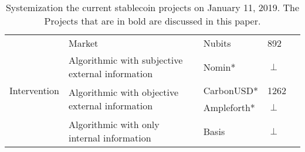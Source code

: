 \begin{table}[h!]
\begin{tabular}{|l|l|l|l|l|}
                                                                                                                 
\multirow{5}{*}{Intervention}                                                           
						& \multirow{1}{*}{Market} 										& Nubits & 892 \\ \cline{2-4}
						& \multirow{1}{*}{Algorithmic with subjective external information}  		& Nomin* & $\perp$  \\ \cline{2-4}
						& \multirow{2}{*}{Algorithmic with objective external information}  		& CarbonUSD* & 1262 \\ \cline{3-4}
						&														& Ampleforth* & $\perp$ \\ \cline{2-4}
						& \multirow{1}{*}{Algorithmic with only internal information} 			& Basis & $\perp$ \\ \hline

\end{tabular}
\vspace{1em}
\caption{\footnotesize{Systemization the current stablecoin projects} on January 11, 2019. The Projects that are in bold are discussed in this paper.}
\label{tab:stablecoins}
\vspace{3em}
\end{table}
